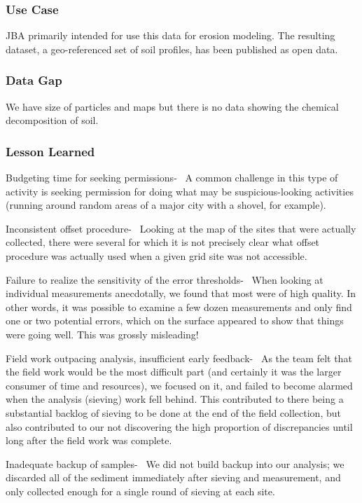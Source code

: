 \documentclass[a4paper,12pt,twoside]{article}
\begin{document}
\subsubsection{Use Case}
JBA  primarily intended for use this data for erosion modeling. The resulting dataset, a geo-referenced set of soil profiles, has been published as open data.

\subsubsection{Data Gap}
We have size of particles and maps but there is no data showing the chemical decomposition of soil.

\subsubsection{Lesson Learned}
{\color {RHblue}Budgeting time for seeking permissions-}
\
A common challenge in this type of activity is seeking permission for doing what may be suspicious-looking activities (running around random areas of a major city with a shovel, for example).

{\color {RHblue}Inconsistent offset procedure-}
\
Looking at the map of the sites that were actually collected, there were several for which it is not precisely clear what offset procedure was actually used when a given grid site was not accessible.

{\color{RHblue}Failure to realize the sensitivity of the error thresholds-}
\
When looking at individual measurements anecdotally, we found that most were of high quality. In other words, it was possible to examine a few dozen measurements and only find one or two potential errors, which on the surface appeared to show that things were going well. This was grossly misleading!

{\color{RHblue} Field work outpacing analysis, insufficient early feedback-}
\
As the team felt that the field work would be the most difficult part (and certainly it was the larger consumer of time and resources), we focused on it, and failed to become alarmed when the analysis (sieving) work fell behind. This contributed to there being a substantial backlog of sieving to be done at the end of the field collection, but also contributed to our not discovering the high proportion of discrepancies until long after the field work was complete.

{\color{RHblue}Inadequate backup of samples-}
\
We did not build backup into our analysis; we discarded all of the sediment immediately after sieving and measurement, and only collected enough for a single round of sieving at each site.
\end{document}
